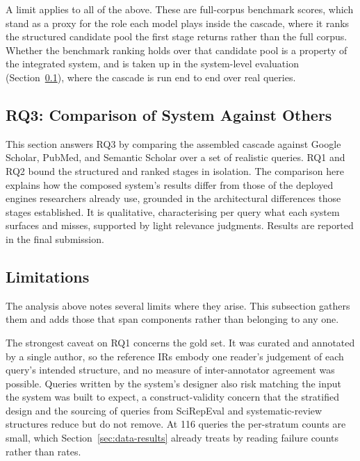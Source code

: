 A limit applies to all of the above. These are full-corpus benchmark scores, which stand as a proxy for the role each model plays inside the cascade, where it ranks the structured candidate pool the first stage returns rather than the full corpus. Whether the benchmark ranking holds over that candidate pool is a property of the integrated system, and is taken up in the system-level evaluation (Section~\ref{subsec:rq3}), where the cascade is run end to end over real queries.

\subsection{RQ3: Comparison of System Against Others}
\label{subsec:rq3}

This section answers RQ3 by comparing the assembled cascade against Google Scholar, PubMed, and Semantic Scholar over a set of realistic queries. RQ1 and RQ2 bound the structured and ranked stages in isolation. The comparison here explains how the composed system's results differ from those of the deployed engines researchers already use, grounded in the architectural differences those stages established. It is qualitative, characterising per query what each system surfaces and misses, supported by light relevance judgments. Results are reported in the final submission.

\subsection{Limitations}
\label{subsec:limitations}

The analysis above notes several limits where they arise. This subsection gathers them and adds those that span components rather than belonging to any one.

The strongest caveat on RQ1 concerns the gold set. It was curated and annotated by a single author, so the reference IRs embody one reader's judgement of each query's intended structure, and no measure of inter-annotator agreement was possible. Queries written by the system's designer also risk matching the input the system was built to expect, a construct-validity concern that the stratified design and the sourcing of queries from SciRepEval and systematic-review structures reduce but do not remove. At 116 queries the per-stratum counts are small, which Section~\ref{sec:data-results} already treats by reading failure counts rather than rates.

